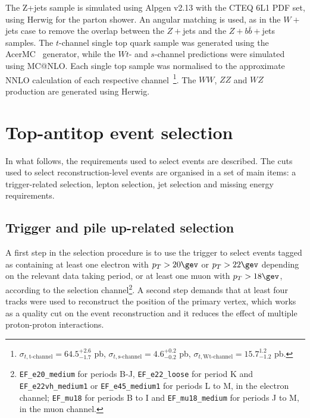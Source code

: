 The Z+jets sample is simulated using Alpgen v2.13 with the CTEQ 6L1 PDF set, using Herwig for the parton shower. An angular matching is used, as in the $W+$ jets case to
remove the overlap between the $Z+$jets and the $Z+b\bar{b}+$jets samples.
The $t$-channel single top quark sample was generated using the AcerMC~\cite{acermc} generator, while the $Wt$- and $s$-channel predictions were simulated
using MC@NLO. Each single top sample was normalised to the approximate NNLO calculation of each respective
channel~\cite{stop1,stop2,stop3}\footnote{$\sigma_{t, \textrm{t-channel}} = 64.5^{+2.6}_{-1.7}$ pb, $\sigma_{t, \textrm{s-channel}} = 4.6^{+0.2}_{-0.2}$ pb,
$\sigma_{t, \textrm{Wt-channel}} = 15.7^{1.2}_{-1.2}$ pb.}. The $WW$, $ZZ$ and $WZ$ production are generated using Herwig.

\section{Top-antitop event selection}
\label{sec:ttjets_selection}


In what follows, the requirements used to select events are described.
The cuts used to select reconstruction-level events are organised in a set of main items:
a trigger-related selection, lepton selection, jet selection and missing energy requirements.

\subsection{Trigger and pile up-related selection}

A first step in the selection procedure is to use the trigger to select events tagged as containing at least one electron with $p_T > 20\gev$ or $p_T > 22\gev$
depending on the relevant data taking period,
or at least one muon with $p_T > 18\gev$,
according to the selection channel\footnote{\texttt{EF\_e20\_medium} for periods B-J, \texttt{EF\_e22\_loose} for period K and
\texttt{EF\_e22vh\_medium1} or \texttt{EF\_e45\_medium1} for periods L to M, in the electron channel; \texttt{EF\_mu18} for periods B to I and \texttt{EF\_mu18\_medium} for periods J to M, in the muon channel.}.
A second step demands that at least four tracks were used to reconstruct the position of the primary vertex, which
works as a quality cut on the event reconstruction and it reduces the effect of multiple proton-proton interactions.

